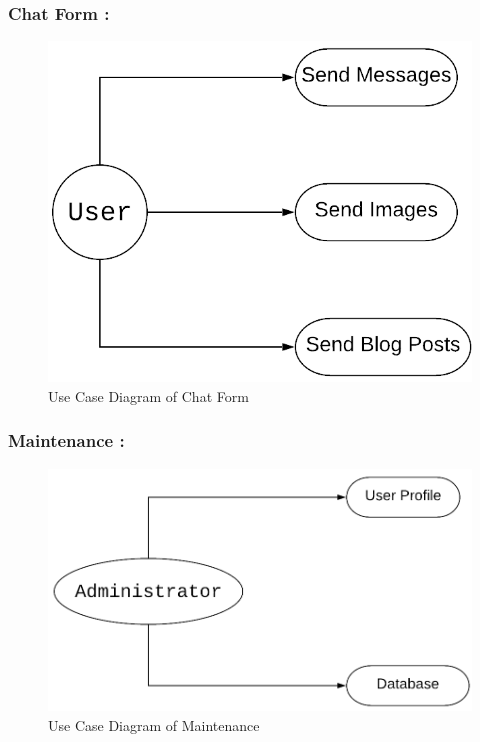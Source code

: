 \subsubsection{Chat Form :}
\noindent
\begin{figure}[!ht]
	\centering
	\includegraphics[scale=0.5]{chat-diagram.png}
	\caption{\label{img6}  Use Case Diagram of Chat Form}
\end{figure}



\subsubsection{Maintenance :}
\noindent
\begin{figure}[!ht]
	\centering
	\includegraphics[scale=0.4]{maintenance.png}
	\caption{\label{img7}  Use Case Diagram of Maintenance}
\end{figure}
\vspace{50ex}
